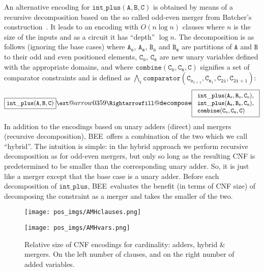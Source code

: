 \documentclass[runningheads,a4paper]{llncs}
\makeatletter
\newcommand{\xRightarrow}[2][]{\ext@arrow 0359\Rightarrowfill@{#1}{#2}}
\newcommand{\bee}{\textsf{BEE}}
\makeatother
\begin{document}
An alternative encoding for $\mathtt{int\_plus(A,B,C)}$ is obtained by
means of a recursive decomposition based on the so called odd-even
merger from Batcher's construction~\cite{Batcher68}. It leads to an
encoding with $O(n\log n)$ clauses where $n$ is the size of the inputs
and as a circuit it has ``depth'' $\log n$. The decomposition is as
follows (ignoring the base cases) where $\mathtt{A_{o}}$,
$\mathtt{A_{e}}$, $\mathtt{B_{o}}$ and $\mathtt{B_{e}}$ are partitions
of $\mathtt{A}$ and $\mathtt{B}$ to their odd and even positioned
elements, $\mathtt{C_o}$, $\mathtt{C_e}$ are new unary variables
defined with the appropriate domains, and where
$\mathtt{combine(C_o,C_e,C)}$ signifies a set of comparator
constraints and is defined as $\bigwedge_{i}
\mathtt{comparator(C_{o_{i+1}},C_{e_i},C_{2i},C_{2i+1})}$:
\[\small
\fbox{$\mathtt{int\_plus(A,B,C)}$}
\xRightarrow[]{\mathtt{decompose}}
\fbox{$
  \begin{array}{l}
     \mathtt{int\_plus(A_o,B_o,C_o)},\\
     \mathtt{int\_plus(A_e,B_e,C_e)},\\
     \mathtt{combine(C_o,C_e,C)}
  \end{array}$}
\] 
In addition to the encodings based on unary adders (direct) and
mergers (recursive decomposition), \bee\ offers a combination of the
two which we call ``hybrid''.  The intuition is simple: in the hybrid
approach we perform recursive decomposition as for odd-even mergers,
but only so long as the resulting CNF is predetermined to be
smaller than the corresponding unary adder. So, it is just like a
merger except that the base case is a unary adder.
Before each decomposition of $\mathtt{int\_plus}$, \bee\ evaluates the
benefit (in terms of CNF size) of decomposing the constraint as a
merger and takes the smaller of the two.


\begin{figure}[t]
\begin{minipage}{0.47\linewidth}
  \texttt{[image: pos\_imgs/AMHclauses.png]}
\end{minipage}
\qquad
\begin{minipage}{0.47\linewidth}
\texttt{[image: pos\_imgs/AMHvars.png]}
\end{minipage}
\caption {Relative size of CNF encodings for cardinality: adders,
  hybrid \& mergers. On the left number of clauses, and on the right
  number of added variables.}
 \label{fig:size}
\end{figure}
\end{document}

